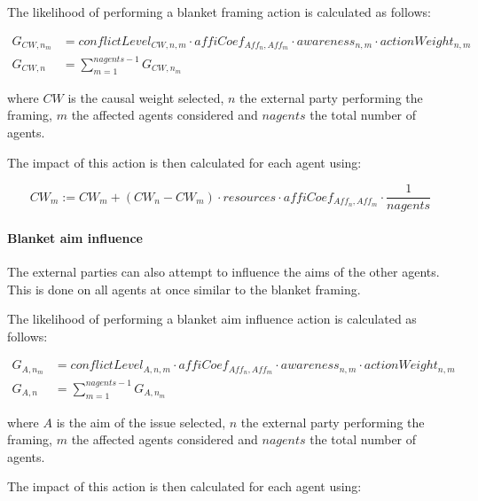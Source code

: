 The likelihood of performing a blanket framing action is calculated as follows:

\begin{equation}\label{eq:likelihoodBlanketFraming}\begin{split}
G_{CW, n_m} &= conflictLevel_{CW, n, m} \cdot affiCoef_{Aff_n,Aff_m} \cdot awareness_{n,m} \cdot actionWeight_{n,m}\\
G_{CW, n} &= \sum_{m = 1}^{nagents-1} G_{CW, n_m}
\end{split}\end{equation}

where $CW$ is the causal weight selected, $n$ the external party performing the framing, $m$ the affected agents considered and $nagents$ the total number of agents.

The impact of this action is then calculated for each agent using:

\begin{equation}\label{eq:impactBlanketFraming}
CW_{m} := CW_{m} + \left( CW_{n} - CW_{m} \right) \cdot resources \cdot affiCoef_{Aff_n,Aff_m} \cdot \frac{1}{nagents}
\end{equation}

\paragraph{Blanket aim influence}

The external parties can also attempt to influence the aims of the other agents. This is done on all agents at once similar to the blanket framing.

The likelihood of performing a blanket aim influence action is calculated as follows:

\begin{equation}\label{eq:likelihoodBlanketFraming}\begin{split}
G_{A, n_m} &= conflictLevel_{A, n, m} \cdot affiCoef_{Aff_n,Aff_m} \cdot awareness_{n,m} \cdot actionWeight_{n,m}\\
G_{A, n} &= \sum_{m = 1}^{nagents-1} G_{A, n_m}
\end{split}\end{equation}

where $A$ is the aim of the issue selected, $n$ the external party performing the framing, $m$ the affected agents considered and $nagents$ the total number of agents.

The impact of this action is then calculated for each agent using:

